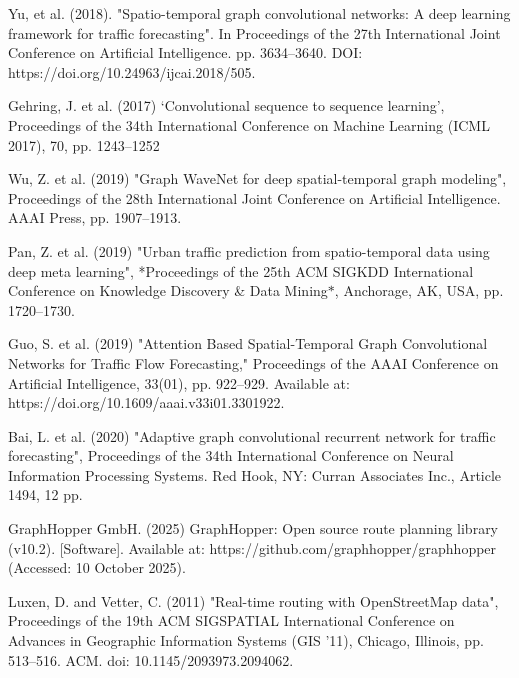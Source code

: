 \begin{thebibliography}{99}
        Yu, et al. (2018). "Spatio-temporal graph convolutional networks: A deep learning framework for traffic forecasting". In Proceedings of the 27th International Joint Conference on Artificial Intelligence. pp. 3634–3640. DOI: https://doi.org/10.24963/ijcai.2018/505.

        Gehring, J. et al. (2017) ‘Convolutional sequence to sequence learning’, Proceedings of the 34th International Conference on Machine Learning (ICML 2017), 70, pp. 1243–1252

        Wu, Z. et al. (2019) "Graph WaveNet for deep spatial-temporal graph modeling", Proceedings of the 28th International Joint Conference on Artificial Intelligence. AAAI Press, pp. 1907–1913.

        Pan, Z. et al. (2019) "Urban traffic prediction from spatio-temporal data using deep meta learning", *Proceedings of the 25th ACM SIGKDD International Conference on Knowledge Discovery \& Data Mining$*$, Anchorage, AK, USA, pp. 1720–1730.


        Guo, S. et al. (2019) "Attention Based Spatial-Temporal Graph Convolutional Networks for Traffic Flow Forecasting," Proceedings of the AAAI Conference on Artificial Intelligence, 33(01), pp. 922–929. Available at: https://doi.org/10.1609/aaai.v33i01.3301922.

        Bai, L. et al. (2020) "Adaptive graph convolutional recurrent network for traffic forecasting", Proceedings of the 34th International Conference on Neural Information Processing Systems. Red Hook, NY: Curran Associates Inc., Article 1494, 12 pp.

        GraphHopper GmbH. (2025) GraphHopper: Open source route planning library (v10.2). [Software]. Available at: https://github.com/graphhopper/graphhopper (Accessed: 10 October 2025).

        Luxen, D. and Vetter, C. (2011) "Real-time routing with OpenStreetMap data", Proceedings of the 19th ACM SIGSPATIAL International Conference on Advances in Geographic Information Systems (GIS '11), Chicago, Illinois, pp. 513–516. ACM. doi: 10.1145/2093973.2094062.


\end{thebibliography}
